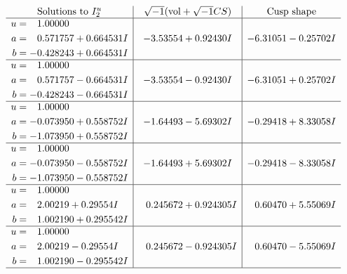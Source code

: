 \documentclass[1p]{elsarticle_modified}
\theoremstyle{definition}
\newcommand{\I}{\sqrt{-1}}
\begin{document}
$$\begin{array}{c|c|c}  
\text{Solutions to }I^u_{2}& \I (\text{vol} + \sqrt{-1}CS) & \text{Cusp shape}\\
 \hline 
\begin{aligned}
u &= \phantom{-}1.00000\phantom{ +0.000000I} \\
a &= \phantom{-}0.571757 + 0.664531 I \\
b &= -0.428243 + 0.664531 I\end{aligned}
 & -3.53554 + 0.92430 I & -6.31051 - 0.25702 I \\ \hline\begin{aligned}
u &= \phantom{-}1.00000\phantom{ +0.000000I} \\
a &= \phantom{-}0.571757 - 0.664531 I \\
b &= -0.428243 - 0.664531 I\end{aligned}
 & -3.53554 - 0.92430 I & -6.31051 + 0.25702 I \\ \hline\begin{aligned}
u &= \phantom{-}1.00000\phantom{ +0.000000I} \\
a &= -0.073950 + 0.558752 I \\
b &= -1.073950 + 0.558752 I\end{aligned}
 & -1.64493 - 5.69302 I & -0.29418 + 8.33058 I \\ \hline\begin{aligned}
u &= \phantom{-}1.00000\phantom{ +0.000000I} \\
a &= -0.073950 - 0.558752 I \\
b &= -1.073950 - 0.558752 I\end{aligned}
 & -1.64493 + 5.69302 I & -0.29418 - 8.33058 I \\ \hline\begin{aligned}
u &= \phantom{-}1.00000\phantom{ +0.000000I} \\
a &= \phantom{-}2.00219 + 0.29554 I \\
b &= \phantom{-}1.002190 + 0.295542 I\end{aligned}
 & \phantom{-}0.245672 + 0.924305 I & \phantom{-}0.60470 + 5.55069 I \\ \hline\begin{aligned}
u &= \phantom{-}1.00000\phantom{ +0.000000I} \\
a &= \phantom{-}2.00219 - 0.29554 I \\
b &= \phantom{-}1.002190 - 0.295542 I\end{aligned}
 & \phantom{-}0.245672 - 0.924305 I & \phantom{-}0.60470 - 5.55069 I\\
 \hline 
 \end{array}$$\newpage
\end{document}
